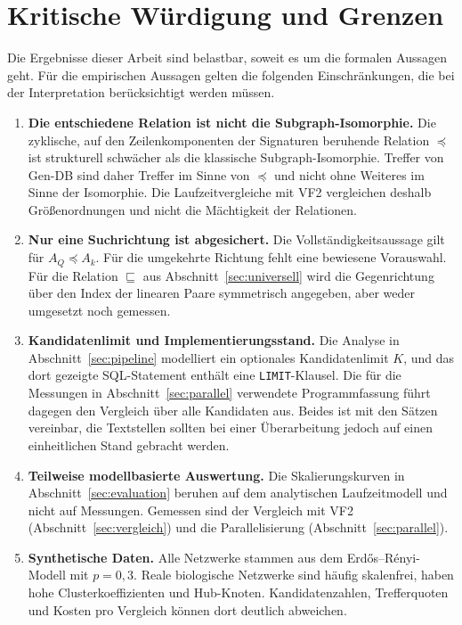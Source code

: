 \documentclass[a4paper,12pt, twoside]{report}
\theoremstyle{definition}
\begin{document}
\section{Kritische Würdigung und Grenzen}
\label{sec:grenzen}

Die Ergebnisse dieser Arbeit sind belastbar, soweit es um die formalen Aussagen geht. Für die empirischen Aussagen gelten die folgenden Einschränkungen, die bei der Interpretation berücksichtigt werden müssen.

\begin{enumerate}
	\item \textbf{Die entschiedene Relation ist nicht die Subgraph-Isomorphie.} Die zyklische, auf den Zeilenkomponenten der Signaturen beruhende Relation $\preceq$ ist strukturell schwächer als die klassische Subgraph-Isomorphie. Treffer von Gen-DB sind daher Treffer im Sinne von $\preceq$ und nicht ohne Weiteres im Sinne der Isomorphie. Die Laufzeitvergleiche mit VF2 vergleichen deshalb Größenordnungen und nicht die Mächtigkeit der Relationen.
	\item \textbf{Nur eine Suchrichtung ist abgesichert.} Die Vollständigkeitsaussage gilt für $A_Q \preceq A_k$. Für die umgekehrte Richtung fehlt eine bewiesene Vorauswahl. Für die Relation $\sqsubseteq$ aus Abschnitt~\ref{sec:universell} wird die Gegenrichtung über den Index der linearen Paare symmetrisch angegeben, aber weder umgesetzt noch gemessen.
	\item \textbf{Kandidatenlimit und Implementierungsstand.} Die Analyse in Abschnitt~\ref{sec:pipeline} modelliert ein optionales Kandidatenlimit $K$, und das dort gezeigte SQL-Statement enthält eine \texttt{LIMIT}-Klausel. Die für die Messungen in Abschnitt~\ref{sec:parallel} verwendete Programmfassung führt dagegen den Vergleich über alle Kandidaten aus. Beides ist mit den Sätzen vereinbar, die Textstellen sollten bei einer Überarbeitung jedoch auf einen einheitlichen Stand gebracht werden.
	\item \textbf{Teilweise modellbasierte Auswertung.} Die Skalierungskurven in Abschnitt~\ref{sec:evaluation} beruhen auf dem analytischen Laufzeitmodell und nicht auf Messungen. Gemessen sind der Vergleich mit VF2 (Abschnitt~\ref{sec:vergleich}) und die Parallelisierung (Abschnitt~\ref{sec:parallel}).
	\item \textbf{Synthetische Daten.} Alle Netzwerke stammen aus dem Erdős–Rényi-Modell mit $p=0{,}3$. Reale biologische Netzwerke sind häufig skalenfrei, haben hohe Clusterkoeffizienten und Hub-Knoten. Kandidatenzahlen, Trefferquoten und Kosten pro Vergleich können dort deutlich abweichen.

\end{enumerate}
\end{document}
